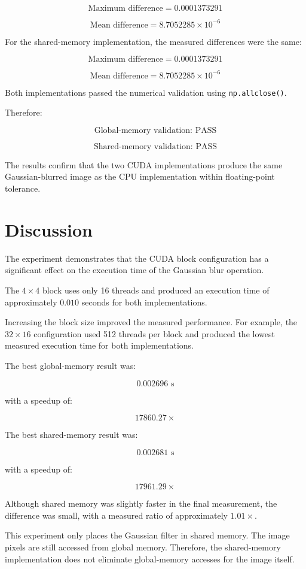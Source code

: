 \documentclass[11pt]{article}
\begin{document}
\[
\text{Maximum difference}
=
0.0001373291
\]

\[
\text{Mean difference}
=
8.7052285\times10^{-6}
\]

For the shared-memory implementation, the measured differences were
the same:

\[
\text{Maximum difference}
=
0.0001373291
\]

\[
\text{Mean difference}
=
8.7052285\times10^{-6}
\]

Both implementations passed the numerical validation using
\texttt{np.allclose()}.

Therefore:

\[
\boxed{\text{Global-memory validation: PASS}}
\]

\[
\boxed{\text{Shared-memory validation: PASS}}
\]

The results confirm that the two CUDA implementations produce the same
Gaussian-blurred image as the CPU implementation within floating-point
tolerance.

\section{Discussion}

The experiment demonstrates that the CUDA block configuration has a
significant effect on the execution time of the Gaussian blur operation.

The $4\times4$ block uses only 16 threads and produced an execution time
of approximately $0.010$ seconds for both implementations.

Increasing the block size improved the measured performance. For example,
the $32\times16$ configuration used 512 threads per block and produced
the lowest measured execution time for both implementations.

The best global-memory result was:

\[
0.002696\text{ s}
\]

with a speedup of:

\[
17860.27\times
\]

The best shared-memory result was:

\[
0.002681\text{ s}
\]

with a speedup of:

\[
17961.29\times
\]

Although shared memory was slightly faster in the final measurement,
the difference was small, with a measured ratio of approximately
$1.01\times$.

This experiment only places the Gaussian filter in shared memory. The
image pixels are still accessed from global memory. Therefore, the
shared-memory implementation does not eliminate global-memory accesses
for the image itself.
\end{document}
